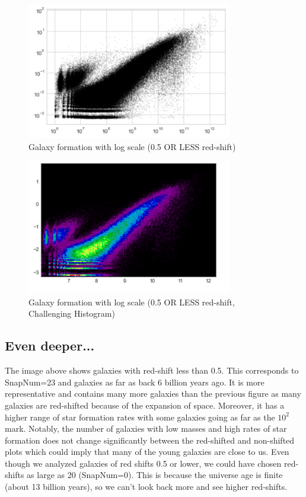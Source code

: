 \documentclass[12pt]{article}
\begin{document}
\begin{figure}[h]
  \caption{Galaxy formation with log scale (0.5 OR LESS red-shift)}
  \centering
  \includegraphics[width=0.8\textwidth]{g2.png}
\end{figure}
\begin{figure}[h]
  \caption{Galaxy formation with log scale (0.5 OR LESS red-shift, Challenging Histogram)}
  \centering
  \includegraphics[width=0.8\textwidth]{y.png}
\end{figure}
\newpage

\subsection{Even deeper...}
The image above shows galaxies with red-shift less than 0.5. This corresponds to SnapNum=23 and galaxies as far as back 6 billion years ago. It is more representative and contains many more galaxies than the previous figure as many galaxies are red-shifted because of the expansion of space. Moreover, it has  a higher range of star formation rates with some galaxies going as far as the $10^2$ mark. Notably, the number of galaxies with low masses and high rates of star formation does not change significantly between the red-shifted and non-shifted plots which could imply that many of the young galaxies are close to us. Even though we analyzed galaxies of red shifts 0.5 or lower, we could have chosen red-shifts as large as 20 (SnapNum=0). This is because the universe age is finite (about 13 billion years), so we can't look back more and see higher red-shifts.
\end{document}
